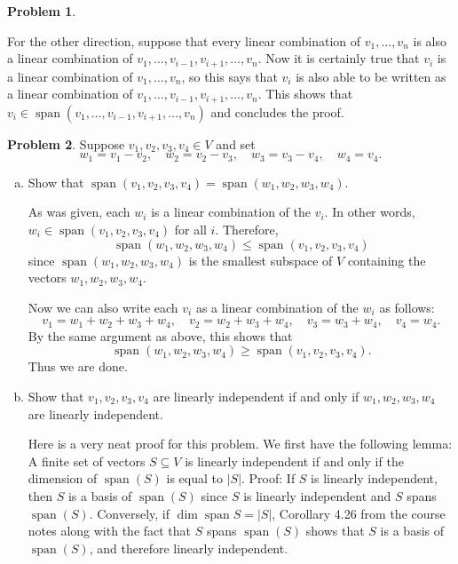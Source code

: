 \documentclass[11pt,oneside]{amsart}
\theoremstyle{definition}
\newtheorem{problem}{Problem}
\DeclareMathOperator{\Span}{span}
\begin{document}
\begin{problem}
\begin{enumerate}[(a)]
\begin{solution}
                For the other direction, suppose that every linear combination of $v_1,\dots,v_n$ is also a linear combination of $v_1,\dots,v_{i-1},v_{i+1},\dots,v_n$. Now it is certainly true that $v_i$ is a linear combination of $v_1,\dots,v_n$, so this says that $v_i$ is also able to be written as a linear combination of $v_1,\dots,v_{i-1},v_{i+1},\dots,v_n$. This shows that $v_i\in\Span(v_1,\dots,v_{i-1},v_{i+1},\dots,v_n)$ and concludes the proof.
            \end{solution}
        \end{enumerate}
    \end{problem}
    
    \begin{problem}
        Suppose $v_1,v_2,v_3,v_4\in V$ and set
        \[w_1=v_1-v_2,\quad w_2=v_2-v_3,\quad w_3=v_3-v_4,\quad w_4=v_4.\]
        \begin{enumerate}[(a)]
            \item Show that $\Span(v_1,v_2,v_3,v_4)=\Span(w_1,w_2,w_3,w_4)$.
            \begin{solution}
                As was given, each $w_i$ is a linear combination of the $v_i$. In other words, $w_i\in\Span(v_1,v_2,v_3,v_4)$ for all $i$. Therefore,
                \[\Span(w_1,w_2,w_3,w_4)\leq\Span(v_1,v_2,v_3,v_4)\]
                since $\Span(w_1,w_2,w_3,w_4)$ is the smallest subspace of $V$ containing the vectors $w_1,w_2,w_3,w_4$.

                Now we can also write each $v_i$ as a linear combination of the $w_i$ as follows:
                \[v_1=w_1+w_2+w_3+w_4,\quad v_2=w_2+w_3+w_4,\quad v_3=w_3+w_4,\quad v_4=w_4.\]
                By the same argument as above, this shows that
                \[\Span(w_1,w_2,w_3,w_4)\geq\Span(v_1,v_2,v_3,v_4).\]
                Thus we are done.
            \end{solution}
            \item Show that $v_1,v_2,v_3,v_4$ are linearly independent if and only if $w_1,w_2,w_3,w_4$ are linearly independent.
            \begin{solution}
                Here is a very neat proof for this problem. We first have the following lemma: A finite set of vectors $S\subseteq V$ is linearly independent if and only if the dimension of $\Span (S)$ is equal to $|S|$. Proof: If $S$ is linearly independent, then $S$ is a basis of $\Span (S)$ since $S$ is linearly independent and $S$ spans $\Span (S)$. Conversely, if $\dim\Span S=|S|$, Corollary 4.26 from the course notes along with the fact that $S$ spans $\Span(S)$ shows that $S$ is a basis of $\Span (S)$, and therefore linearly independent. 


\end{solution}
\end{enumerate}
\end{problem}
\end{document}
